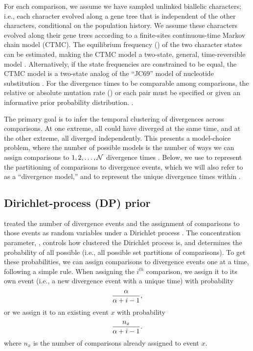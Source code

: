 \documentclass[letterpaper,12pt]{article}
\begin{document}
For each comparison, we assume we have sampled unlinked biallelic characters;
i.e., each character evolved along a gene tree that is independent of the
other characters, conditional on the population history.
We assume these characters evolved along their gene trees according to a
finite-sites continuous-time Markov chain model (CTMC).
The equilibrium frequency (\gfreq) of the two character states can be
estimated, making the CTMC model a two-state, general, time-reversible model
\citep{Tavare1986}.
Alternatively, if the state frequencies are constrained to be equal, the CTMC
model is a two-state analog of the ``JC69'' model of nucleotide substitution
\citep{JC1969}.
For the divergence times to be comparable among comparisons, the relative or
absolute mutation rate (\murate) or each pair must be specified or given an
informative prior probability distribution.
\citep{Oaks2018ecoevolity,Oaks2019codemog}.

The primary goal is to infer the temporal clustering of divergences across
\ncomparisons comparisons.
At one extreme, all \ncomparisons could have diverged at the same time,
and at the other extreme, all \ncomparisons diverged independently.
This presents a model-choice problem, where the number of possible models
is the number of ways we can assign \ncomparisons comparisons to
$1, 2,  \ldots, \mathcal{N}$ divergence times
\citep[the Bell number;][]{Bell1934}.
Below, we use \etimesets to represent the partitioning of comparisons to
divergence events, which we will also refer to as a ``divergence model,'' and
\etimes to represent the unique divergence times within \etimesets.

\subsection{Dirichlet-process (DP) prior}

\begin{linenomath}
\citet{Oaks2018ecoevolity} treated the number of divergence events and the
assignment of comparisons to those events as random variables under a Dirichlet
process \citep{Ferguson1973, Antoniak1974}.
The concentration parameter, \concentration, controls how clustered the
Dirichlet process is, and determines the probability of all possible \etimesets
(i.e., all possible set partitions of \ncomparisons comparisons).
To get these probabilities, we can assign comparisons to divergence events one
at a time, following a simple rule.
When assigning the $i^{th}$ comparison, we assign it to its own event
(i.e., a new divergence event with a unique time) with probability
\begin{equation}
    \frac{\alpha}{\alpha + i - 1},
    \label{eq:dpnewcat}
\end{equation}
or we assign it to an existing event $x$ with probability
\begin{equation}
    \frac{n_x}{\alpha + i - 1}.
    \label{eq:dpexistingcat}
\end{equation}
where $n_x$ is the number of comparisons already assigned to event $x$.
\end{linenomath}
\end{document}
